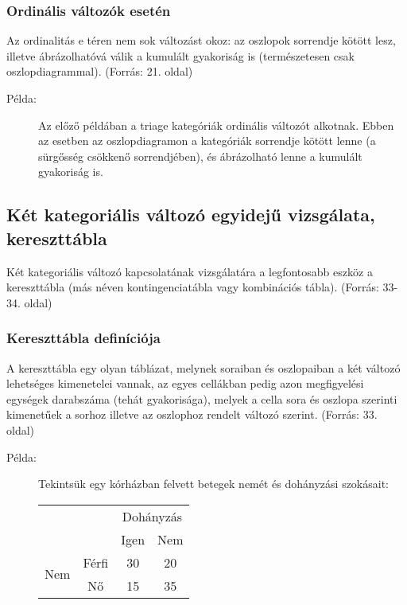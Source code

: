 \documentclass[a4paper,12pt]{article}
\begin{document}
    \subsubsection{Ordinális változók esetén}

    Az ordinalitás e téren nem sok változást okoz: az oszlopok sorrendje kötött lesz, illetve ábrázolhatóvá válik a kumulált gyakoriság is (természetesen csak oszlopdiagrammal).
    (Forrás: 21. oldal)

    \begin{description}
        \item[Példa:] Az előző példában a triage kategóriák ordinális változót alkotnak. Ebben az esetben az oszlopdiagramon a kategóriák sorrendje kötött lenne (a sürgősség csökkenő sorrendjében), és ábrázolható lenne a kumulált gyakoriság is.
    \end{description}

    \subsection{Két kategoriális változó egyidejű vizsgálata, kereszttábla}

    Két kategoriális változó kapcsolatának vizsgálatára a legfontosabb eszköz a kereszttábla (más néven kontingenciatábla vagy kombinációs tábla).
    (Forrás: 33-34. oldal)

    \subsubsection{Kereszttábla definíciója}

    A kereszttábla egy olyan táblázat, melynek soraiban és oszlopaiban a két változó lehetséges kimenetelei vannak, az egyes cellákban pedig azon megfigyelési egységek darabszáma (tehát gyakorisága), melyek a cella sora és oszlopa szerinti kimenetűek a sorhoz illetve az oszlophoz rendelt változó szerint.
    (Forrás: 33. oldal)

    \begin{description}
        \item[Példa:] Tekintsük egy kórházban felvett betegek nemét és dohányzási szokásait:

        \begin{center}
            \begin{tabular}{|c|c|c|c|}
                \hline
                \multicolumn{2}{|c|}{} & \multicolumn{2}{c|}{Dohányzás} \\
                \cline{3-4}
                \multicolumn{2}{|c|}{} & Igen & Nem \\
                \hline
                \multirow{2}{*}{Nem} & Férfi & 30 & 20 \\
                \cline{2-4}
                & Nő    & 15 & 35 \\
                \hline
            \end{tabular}
        \end{center}

    \end{description}
\end{document}
